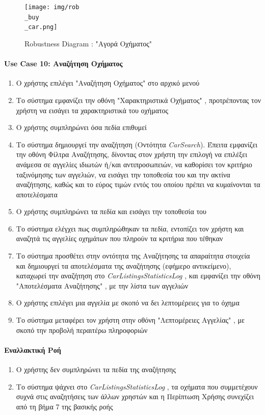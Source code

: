 \documentclass{../ol-softwaremanual}
\begin{document}
	
	\begin{figure}[htbp!]
		\texttt{[image: img/rob\\\_buy\\\_car.png]}
		\caption{\en Robustness Diagram : "\gr Αγορά Οχήματος\en"\gr}
	\end{figure}
	
	
	\newpage
	\centering
	\paragraph{\en Use Case 10: \gr Αναζήτηση Οχήματος}  
	\begin{enumerate}
		\item Ο χρήστης επιλέγει \en"\gr Αναζήτηση Οχήματος\en" \gr στο αρχικό μενού
		\item Το σύστημα εμφανίζει την οθόνη \en"\gr Χαρακτηριστικά Οχήματος\en" \gr, προτρέποντας τον χρήστη να εισάγει τα χαρακτηριστικά του οχήματος 
		\item Ο χρήστης συμπληρώνει όσα πεδία επιθυμεί
		\item Το σύστημα δημιουργεί την αναζήτηση (Οντότητα \en \textit{CarSearch}\gr). Έπειτα εμφανίζει την οθόνη Φίλτρα Αναζήτησης, δίνοντας στον χρήστη την επιλογή να επιλέξει ανάμεσα σε αγγελίες ιδιωτών ή/και αντιπροσωπειών, να καθορίσει τον κριτήριο ταξινόμησης των αγγελιών, να εισάγει την τοποθεσία του και την ακτίνα αναζήτησης, καθώς και το εύρος τιμών εντός του οποίου πρέπει να κυμαίνονται τα αποτελέσματα
		\item Ο χρήστης συμπληρώνει τα πεδία και εισάγει την τοποθεσία του 
		\item Το σύστημα ελέγχει πως συμπληρώθηκαν τα πεδία, εντοπίζει τον χρήστη και αναζητά τις αγγελίες οχημάτων που πληρούν τα κριτήρια που τέθηκαν		
		\item Το σύστημα προσθέτει στην οντότητα της Αναζήτησης τα απαραίτητα στοιχεία και δημιουργεί τα αποτελέσματα της αναζήτησης (εφήμερο αντικείμενο), καταχωρεί την αναζήτηση στο \en \textit{CarListingsStatisticsLog} \gr, και εμφανίζει την οθόνη \en"\gr Αποτελέσματα Αναζήτησης\en" \gr, με την λίστα των αγγελιών 
		\item Ο χρήστης επιλέγει μια αγγελία με σκοπό να δει λεπτομέρειες για το όχημα
		\item Το σύστημα μεταφέρει τον χρήστη στην οθόνη \en"\gr Λεπτομέρειες Αγγελίας\en" \gr, με σκοπό την προβολή περαιτέρω πληροφοριών	
	\end{enumerate}
	
	
	\paragraph{Εναλλακτική Ροή}
	\begin{enumerate}
		\item Ο χρήστης δεν συμπληρώνει τα πεδία της αναζήτησης
		\item Το σύστημα ψάχνει στο \en \textit{CarListingsStatisticsLog} \gr, τα οχήματα που συμμετέχουν συχνά στις αναζητήσεις των άλλων χρηστών και η Περίπτωση Χρήσης συνεχίζει από τη βήμα 7 της βασικής ροής
	\end{enumerate}
	
\end{document}
